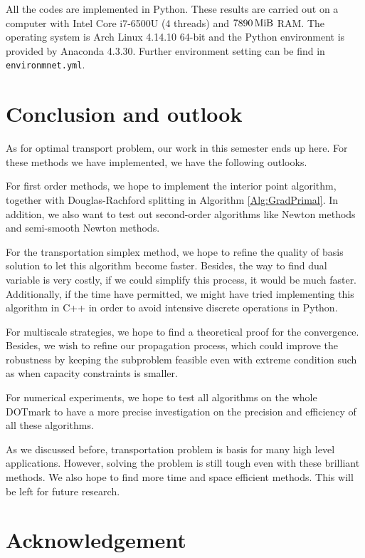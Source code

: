 \documentclass[english]{pkupaper}
\begin{document}
All the codes are implemented in Python. These results are carried out on a computer with Intel Core i7-6500U (4 threads) and $\SI{7890}{\mebi\byte}$ RAM. The operating system is Arch Linux 4.14.10 64-bit and the Python environment is provided by Anaconda 4.3.30. Further environment setting can be find in \verb"environmnet.yml".

\section{Conclusion and outlook} \label{Sec:Con}

As for optimal transport problem, our work in this semester ends up here. For these methods we have implemented, we have the following outlooks. 

For first order methods, we hope to implement the interior point algorithm, together with Douglas-Rachford splitting in Algorithm \ref{Alg:GradPrimal}. In addition, we also want to test out second-order algorithms like Newton methods and semi-smooth Newton methods. 

For the transportation simplex method, we hope to refine the quality of basis solution to let this algorithm become faster. Besides, the way to find dual variable is very costly, if we could simplify this process, it would be much faster. Additionally, if the time have permitted, we might have tried implementing this algorithm in C++ in order to avoid intensive discrete operations in Python. 

For multiscale strategies, we hope to find a theoretical proof for the convergence. Besides, we wish to refine our propagation process, which could improve the robustness by keeping the subproblem feasible even with extreme condition such as when capacity constraints is smaller.

For numerical experiments, we hope to test all algorithms on the whole DOTmark to have a more precise investigation on the precision and efficiency of all these algorithms.

As we discussed before, transportation problem is basis for many high level applications. However, solving the problem is still tough even with these brilliant methods. We also hope to find more time and space efficient methods. This will be left for future research.

\section{Acknowledgement} \label{Sec:Ack}
\end{document}
